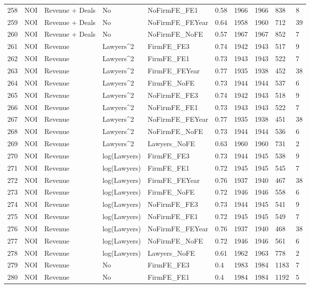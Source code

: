 \begin{table}[ht]
\begin{tabular}{rlllllllll}
  258 & NOI & Revenue + Deals & No & NoFirmFE\_FE1 & 0.58 & 1966 & 1966 & 838 & 8 \\ 
  259 & NOI & Revenue + Deals & No & NoFirmFE\_FEYear & 0.64 & 1958 & 1960 & 712 & 39 \\ 
  260 & NOI & Revenue + Deals & No & NoFirmFE\_NoFE & 0.57 & 1967 & 1967 & 852 & 7 \\ 
  261 & NOI & Revenue & Lawyers^2 & FirmFE\_FE3 & 0.74 & 1942 & 1943 & 517 & 9 \\ 
  262 & NOI & Revenue & Lawyers^2 & FirmFE\_FE1 & 0.73 & 1943 & 1943 & 522 & 7 \\ 
  263 & NOI & Revenue & Lawyers^2 & FirmFE\_FEYear & 0.77 & 1935 & 1938 & 452 & 38 \\ 
  264 & NOI & Revenue & Lawyers^2 & FirmFE\_NoFE & 0.73 & 1944 & 1944 & 537 & 6 \\ 
  265 & NOI & Revenue & Lawyers^2 & NoFirmFE\_FE3 & 0.74 & 1942 & 1943 & 518 & 9 \\ 
  266 & NOI & Revenue & Lawyers^2 & NoFirmFE\_FE1 & 0.73 & 1943 & 1943 & 522 & 7 \\ 
  267 & NOI & Revenue & Lawyers^2 & NoFirmFE\_FEYear & 0.77 & 1935 & 1938 & 451 & 38 \\ 
  268 & NOI & Revenue & Lawyers^2 & NoFirmFE\_NoFE & 0.73 & 1944 & 1944 & 536 & 6 \\ 
  269 & NOI & Revenue & Lawyers^2 & Lawyers\_NoFE & 0.63 & 1960 & 1960 & 731 & 2 \\ 
  270 & NOI & Revenue & log(Lawyers) & FirmFE\_FE3 & 0.73 & 1944 & 1945 & 538 & 9 \\ 
  271 & NOI & Revenue & log(Lawyers) & FirmFE\_FE1 & 0.72 & 1945 & 1945 & 545 & 7 \\ 
  272 & NOI & Revenue & log(Lawyers) & FirmFE\_FEYear & 0.76 & 1937 & 1940 & 467 & 38 \\ 
  273 & NOI & Revenue & log(Lawyers) & FirmFE\_NoFE & 0.72 & 1946 & 1946 & 558 & 6 \\ 
  274 & NOI & Revenue & log(Lawyers) & NoFirmFE\_FE3 & 0.73 & 1944 & 1945 & 541 & 9 \\ 
  275 & NOI & Revenue & log(Lawyers) & NoFirmFE\_FE1 & 0.72 & 1945 & 1945 & 549 & 7 \\ 
  276 & NOI & Revenue & log(Lawyers) & NoFirmFE\_FEYear & 0.76 & 1937 & 1940 & 468 & 38 \\ 
  277 & NOI & Revenue & log(Lawyers) & NoFirmFE\_NoFE & 0.72 & 1946 & 1946 & 561 & 6 \\ 
  278 & NOI & Revenue & log(Lawyers) & Lawyers\_NoFE & 0.61 & 1962 & 1963 & 778 & 2 \\ 
  279 & NOI & Revenue & No & FirmFE\_FE3 & 0.4 & 1983 & 1984 & 1183 & 7 \\ 
  280 & NOI & Revenue & No & FirmFE\_FE1 & 0.4 & 1984 & 1984 & 1192 & 5 \\ 
   \hline
\end{tabular}
\end{table}

